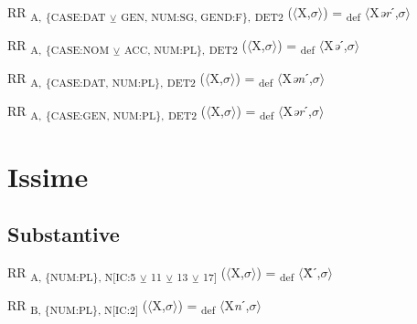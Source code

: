 {\begin{exe}
 RR \textsubscript{A,} \textsubscript{\{CASE:DAT} \textsubscript{${\veebar}$}\textsubscript{ GEN, NUM:SG, GEND:F\},} \textsubscript{DET2} ($\langle$X,$\sigma $$\rangle$) = \textsubscript{def} $\langle$X\textit{ər}ˊ,$\sigma $$\rangle$
\end{exe}

\begin{exe}
 RR \textsubscript{A,} \textsubscript{\{CASE:NOM} \textsubscript{${\veebar}$}\textsubscript{ ACC, NUM:PL\},} \textsubscript{DET2} ($\langle$X,$\sigma $$\rangle$) = \textsubscript{def} $\langle$X\textit{ə}ˊ,$\sigma $$\rangle$
\end{exe}

\begin{exe}
 RR \textsubscript{A,} \textsubscript{\{CASE:DAT, NUM:PL\},} \textsubscript{DET2} ($\langle$X,$\sigma $$\rangle$) = \textsubscript{def} $\langle$X\textit{ən}ˊ,$\sigma $$\rangle$
\end{exe}

\begin{exe}
 RR \textsubscript{A,} \textsubscript{\{CASE:GEN, NUM:PL\},} \textsubscript{DET2} ($\langle$X,$\sigma $$\rangle$) = \textsubscript{def} $\langle$X\textit{ər}ˊ,$\sigma $$\rangle$
\end{exe}

\section{Issime}

\subsection{Substantive}

\begin{exe}
 RR \textsubscript{A, \{NUM:PL\}, N[IC:5} \textsubscript{${\veebar}$}\textsubscript{ 11} \textsubscript{${\veebar}$}\textsubscript{ 13} \textsubscript{${\veebar}$}\textsubscript{ 17]} ($\langle$X,$\sigma $$\rangle$) = \textsubscript{def} $\langle$Ẍˊ,$\sigma $$\rangle$
\end{exe}

\begin{exe}
 RR \textsubscript{B, \{NUM:PL\}, N[IC:2]} ($\langle$X,$\sigma $$\rangle$) = \textsubscript{def} $\langle$X\textit{n}ˊ,$\sigma $$\rangle$
\end{exe}

}
